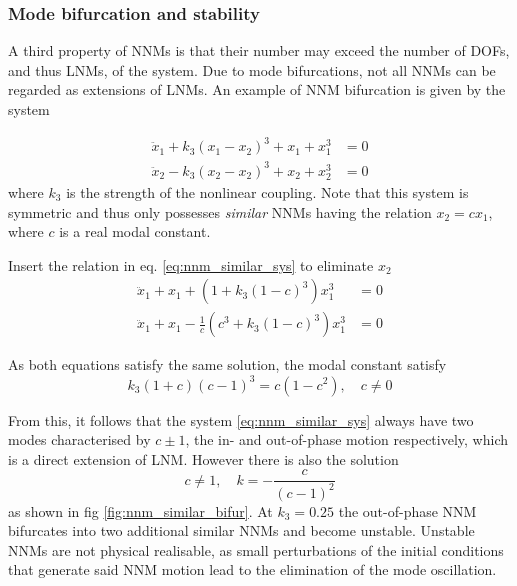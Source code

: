 \subsubsection{Mode bifurcation and stability}
\label{sec:nnm_similar}

A third property of NNMs is that their number may exceed the number of DOFs, and
thus LNMs, of the system. Due to mode bifurcations, not all NNMs can be regarded
as extensions of LNMs. An example of NNM bifurcation is given by the system
\autocite{vakakis1992a}

\begin{equation}
   \label{eq:nnm_similar_sys}
   \begin{aligned}
     \ddot x_1 + k_3(x_1 - x_2)^3 + x_1 + x_1^3&= 0 \\
     \ddot x_2 - k_3(x_2 - x_2)^3 + x_2 + x_2^3&= 0
   \end{aligned}
\end{equation}
where $k_3$ is the strength of the nonlinear coupling. Note that this system is
symmetric and thus only possesses \textit{similar} NNMs having the relation $x_2
= c x_1$, where $c$ is a real modal constant.

Insert the relation in eq. \ref{eq:nnm_similar_sys} to eliminate $x_2$
\begin{equation}
   \label{eq:nnm_similar_sys2}
   \begin{aligned}
     \ddot x_1 + x_1 + \left(1 + k_3(1-c)^3 \right)x_1^3 &= 0 \\
     \ddot x_1 + x_1 - \frac{1}{c} \left(c^3 + k_3(1-c)^3 \right)x_1^3 &= 0
   \end{aligned}
\end{equation}

As both equations satisfy the same solution, the modal constant satisfy
\begin{equation}
  \label{eq:nmm_similar_modal}
  k_3(1+c)(c-1)^3 = c(1-c^2), \quad c \neq 0
\end{equation}

From this, it follows that the system \ref{eq:nnm_similar_sys} always have two
modes characterised by $c\pm1$, the in- and out-of-phase motion respectively, which
is a direct extension of LNM. However there is also the solution
\begin{equation}
  c\neq 1, \quad k = - \frac{c}{(c-1)^2}
\end{equation}
as shown in fig \ref{fig:nnm_similar_bifur}. At $k_3 = 0.25$ the
out-of-phase NNM bifurcates into two additional similar NNMs and become
unstable. Unstable NNMs are not physical realisable, as small perturbations of
the initial conditions that generate said NNM motion lead to the elimination of
the mode oscillation.


